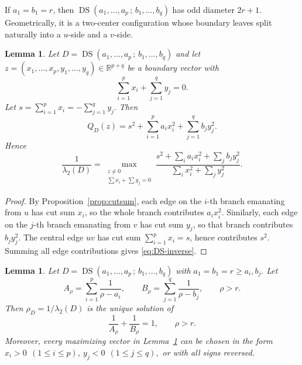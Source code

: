 \documentclass[11pt]{article}
\newtheorem{lemma}[theorem]{Lemma}
\theoremstyle{remark}
\newcommand{\DS}{\operatorname{DS}}
\begin{document}
If $a_1=b_1=r$, then $\DS(a_1,\dots,a_p\,;\,b_1,\dots,b_q)$ has odd diameter $2r+1$.
Geometrically, it is a two-center configuration whose boundary leaves split naturally into a $u$-side and a $v$-side.

\begin{lemma}\label{lem:DS-inverse}
Let
$D=\DS(a_1,\dots,a_p\,;\,b_1,\dots,b_q)$
and let
$z=(x_1,\dots,x_p,y_1,\dots,y_q)\in\mathbb{R}^{p+q}$
be a boundary vector with
$$
\sum_{i=1}^p x_i + \sum_{j=1}^q y_j = 0.
$$
Let $s=\sum_{i=1}^p x_i = -\sum_{j=1}^q y_j.$
Then
\begin{equation}\label{eq:DS-inverse}
Q_D(z)= s^2 + \sum_{i=1}^p a_i x_i^2 + \sum_{j=1}^q b_j y_j^2.
\end{equation}
Hence
$$
\frac{1}{\lambda_2(D)}
=
\max_{\substack{z\ne 0\\ \sum x_i+\sum y_j=0}}
\frac{s^2 + \sum_i a_i x_i^2 + \sum_j b_j y_j^2}{\sum_i x_i^2 + \sum_j y_j^2}.
$$
\end{lemma}

\begin{proof}
By Proposition~\ref{prop:cutsum}, each edge on the $i$-th branch emanating from $u$ has cut sum $x_i$,
so the whole branch contributes $a_i x_i^2$.
Similarly, each edge on the $j$-th branch emanating from $v$ has cut sum $y_j$, so that branch contributes
$b_j y_j^2$.
The central edge $uv$ has cut sum
$\sum_{i=1}^p x_i=s$,
hence contributes $s^2$.
Summing all edge contributions gives \eqref{eq:DS-inverse}.
\end{proof}

\begin{lemma}\label{lem:DS-root}
Let
$D=\DS(a_1,\dots,a_p\,;\,b_1,\dots,b_q)$
with
$a_1=b_1=r\ge a_i,b_j.$
Let
$$
A_\rho=\sum_{i=1}^p \frac{1}{\rho-a_i},
\qquad
B_\rho=\sum_{j=1}^q \frac{1}{\rho-b_j},
\qquad \rho>r.
$$
Then $\rho_D=1/\lambda_2(D)$ is the unique solution of
\begin{equation}\label{eq:DS-root}
\frac{1}{A_\rho}+\frac{1}{B_\rho}=1,
\qquad \rho>r.
\end{equation}
Moreover, every maximizing vector in Lemma~\ref{lem:DS-inverse} can be chosen in the form
$x_i>0\ \ (1\le i\le p)$, $y_j<0\ \ (1\le j\le q),$
or with all signs reversed.
\end{lemma}
\end{document}
